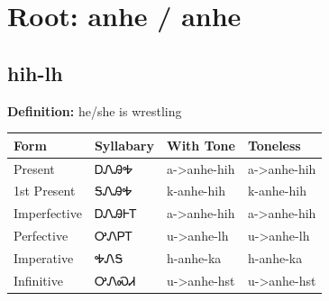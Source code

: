 \documentclass{article}%
\begin{document}
%
\normalsize%
\section*{Root: anhe / anhe}%
\subsection*{hih-lh}%
\textbf{Definition: }%
he/she is wrestling%
\\[0.5em]%
\begin{tabular}{|l|l|l|l|}%
\hline%
\textbf{Form}&\textbf{Syllabary}&\textbf{With Tone}&\textbf{Toneless}\\%
\hline%
Present&ᎠᏁᎯᎭ&a{-}>anhe{-}hih&a{-}>anhe{-}hih\\%
1st Present&ᎦᏁᎯᎭ&k{-}anhe{-}hih&k{-}anhe{-}hih\\%
Imperfective&ᎠᏁᎯᎰᎢ&a{-}>anhe{-}hih&a{-}>anhe{-}hih\\%
Perfective&ᎤᏁᏢᎢ&u{-}>anhe{-}lh&u{-}>anhe{-}lh\\%
Imperative&ᎭᏁᎦ&h{-}anhe{-}ka&h{-}anhe{-}ka\\%
Infinitive&ᎤᏁᏍᏗ&u{-}>anhe{-}hst&u{-}>anhe{-}hst\\%
\hline%
\end{tabular}%
\\[1em]%
\end{document}
